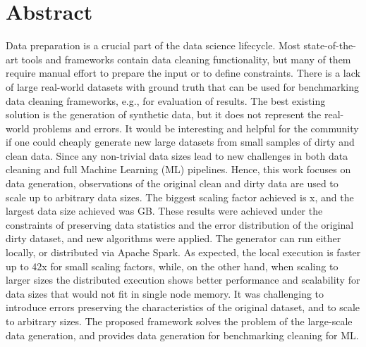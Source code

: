 \chapter*{Abstract}

Data preparation is a crucial part of the data science lifecycle.
Most state-of-the-art tools and frameworks contain data cleaning functionality, 
but many of them require manual effort to prepare the input or to define constraints.
There is a lack of large real-world datasets with ground truth that can be used for benchmarking data cleaning frameworks, e.g., for evaluation of results.
The best existing solution is the generation of synthetic data, but it does not represent the real-world problems and errors.
It would be interesting and helpful for the community if one could cheaply generate new large datasets from small samples of dirty and clean data.
Since any non-trivial data sizes lead to new challenges in both data cleaning and full Machine Learning (ML) pipelines.
Hence, this work focuses on data generation, observations of the original clean and dirty data are used to scale up to arbitrary data sizes.
The biggest scaling factor achieved is x, and the largest data size achieved was  GB.
These results were achieved under the constraints of preserving data statistics and the error distribution of the original dirty dataset, and new algorithms were applied.
The generator can run either locally, or distributed via Apache Spark.
As expected, the local execution is faster up to 42x for small scaling factors, 
while, on the other hand, when scaling to larger sizes the distributed execution shows better performance and scalability for data sizes that would not fit in single node memory.  %
It was challenging to introduce errors preserving the characteristics of the original dataset, and to scale to arbitrary sizes. 
The proposed framework solves the problem of the large-scale data generation, and provides data generation for benchmarking cleaning for ML.



\newpage\null\thispagestyle{empty}\newpage
